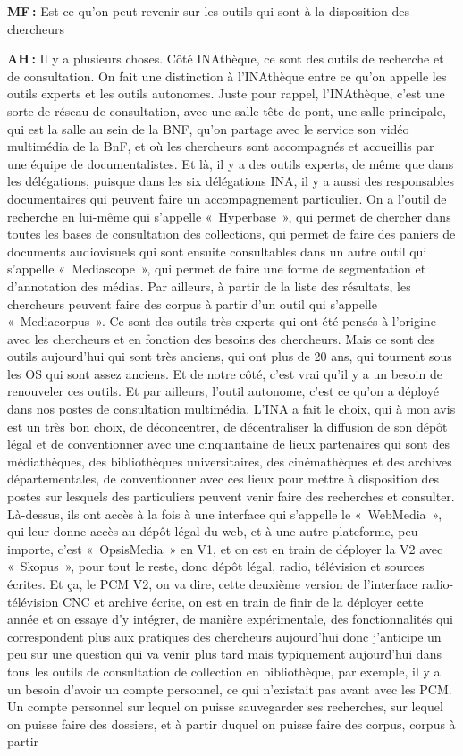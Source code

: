 \textbf{MF :} Est-ce qu'on peut revenir sur les outils qui sont à la disposition des chercheurs 

\textbf{AH :} Il y a plusieurs choses. Côté INAthèque, ce sont des outils de recherche et de consultation.  On fait une distinction à l’INAthèque entre ce qu'on appelle les outils experts et les outils autonomes.  Juste pour rappel, l’INAthèque, c'est une sorte de réseau de consultation, avec une salle tête de pont, une salle principale, qui est la salle au sein de la BNF, qu'on partage avec le service son vidéo multimédia de la BnF, et où les chercheurs sont accompagnés et accueillis par une équipe de documentalistes.  Et là, il y a des outils experts, de même que dans les délégations, puisque dans les six délégations INA, il y a aussi des responsables documentaires qui peuvent faire un accompagnement particulier. On a l'outil de recherche en lui-même qui s'appelle « Hyperbase », qui permet de chercher dans toutes les bases de consultation des collections, qui permet de faire des paniers de documents audiovisuels qui sont ensuite consultables dans un autre outil qui s'appelle « Mediascope », qui permet de faire une forme de segmentation et d'annotation des médias. Par ailleurs, à partir de la liste des résultats, les chercheurs peuvent faire des corpus à partir d'un outil qui s'appelle « Mediacorpus ».  Ce sont des outils très experts qui ont été pensés à l'origine avec les chercheurs et en fonction des besoins des chercheurs.  Mais ce sont des outils aujourd'hui qui sont très anciens, qui ont plus de 20 ans, qui tournent sous les OS qui sont assez anciens. Et de notre côté, c'est vrai qu'il y a un besoin de renouveler ces outils. Et par ailleurs, l'outil autonome, c'est ce qu'on a déployé dans nos postes de consultation multimédia. L'INA a fait le choix, qui à mon avis est un très bon choix, de déconcentrer, de décentraliser la diffusion de son dépôt légal et de conventionner avec une cinquantaine de lieux partenaires qui sont des médiathèques, des bibliothèques universitaires, des cinémathèques et des archives départementales, de conventionner avec ces lieux pour mettre à disposition des postes sur lesquels des particuliers peuvent venir faire des recherches et consulter.  Là-dessus, ils ont accès à la fois à une interface qui s'appelle le « WebMedia », qui leur donne accès au dépôt légal du web, et à une autre plateforme, peu importe, c'est « OpsisMedia » en V1, et on est en train de déployer la V2 avec « Skopus », pour tout le reste, donc dépôt légal, radio, télévision et sources écrites. Et ça, le PCM V2, on va dire, cette deuxième version de l'interface radio-télévision CNC et archive écrite, on est en train de finir de la déployer cette année et on essaye d'y intégrer, de manière expérimentale, des fonctionnalités qui correspondent plus aux pratiques des chercheurs aujourd'hui donc j'anticipe un peu sur une question qui va venir plus tard mais typiquement aujourd'hui dans tous les outils de consultation de collection en bibliothèque, par exemple, il y a un besoin d'avoir un compte personnel, ce qui n'existait pas avant avec les PCM.  Un compte personnel sur lequel on puisse sauvegarder ses recherches, sur lequel on puisse faire des dossiers, et à partir duquel on puisse faire des corpus, corpus à partir 